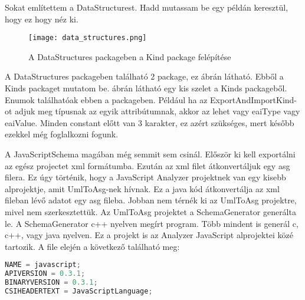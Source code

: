 Sokat említettem a DataStructurest. Hadd mutassam be egy példán keresztül, hogy ez hogy néz ki.

\begin{figure}[!htbp]
      \caption{A DataStructures packageben a Kind package felépítése}\label{fig:data_structures_kinds}
      \centering
      \texttt{[image: data\_structures.png]}
\end{figure}

A DataStructures packageben található 2 package, ez  ábrán látható. Ebből a Kinds packaget mutatom be.
 ábrán látható egy kis szelet a Kinds packageből.
Enumok találhatóak ebben a packageben.
Például ha az ExportAndImportKind-ot adjuk meg típusnak az egyik attribútumnak, akkor az lehet vagy eaiType vagy eaiValue.
Minden constant előtt van 3 karakter, ez azért szükséges, mert később ezekkel még foglalkozni fogunk.

\noindent

A JavaScriptSchema magában még semmit sem csinál. Először ki kell exportálni az egész projectet xml formátumba.
Ezután az xml filet átkonvertáljuk egy asg filera. Ez úgy történik, hogy a JavaScript Analyzer projektnek van egy kisebb alprojektje, amit UmlToAsg-nek hívnak.
Ez a java kód átkonvertálja az xml fileban lévő adatot egy asg fileba. Jobban nem térnék ki az UmlToAsg projektre, mivel nem szerkesztettük.
Az UmlToAsg projektet a SchemaGenerator generálta le. A SchemaGenerator c++ nyelven megírt program. Több mindent is generál c, c++, vagy java nyelven.
Ez a projekt is az Analyzer JavaScript  alprojektei közé tartozik.
A file elején a következő található meg:
\begin{lstlisting}[caption={Asg file első sorai},label={lst:asg_file_eleje}, language={JavaScript}]
NAME = javascript;
APIVERSION = 0.3.1;
BINARYVERSION = 0.3.1;
CSIHEADERTEXT = JavaScriptLanguage;
\end{lstlisting}

